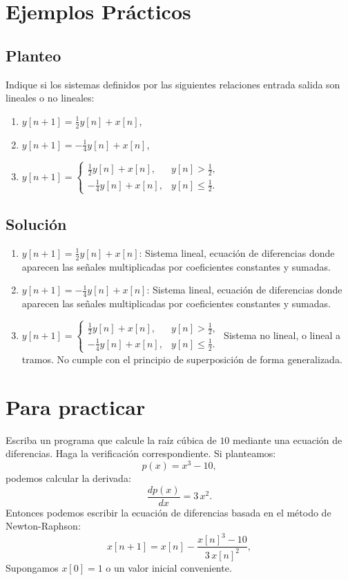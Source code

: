 \section{Ejemplos Prácticos}

\subsection{Planteo}
Indique si los sistemas definidos por las siguientes relaciones entrada salida son lineales o no lineales:
\begin{enumerate}
	\item $y[n+1] = \frac{1}{2} y[n] + x[n]$,
	\item $y[n+1] = -\frac{1}{4} y[n] + x[n]$,
	\item $y[n+1] = \begin{cases} \frac{1}{2}y[n] + x[n], & y[n] > \frac{1}{2}, \\ -\frac{1}{4}y[n] + x[n], & y[n] \leq \frac{1}{2}. \end{cases}$
\end{enumerate}

\subsection{Solución}
\begin{enumerate}
	\item $y[n+1] = \frac{1}{2}y[n] + x[n]$: Sistema lineal, ecuación de diferencias donde aparecen las señales multiplicadas por coeficientes constantes y sumadas.
	\item $y[n+1] = -\frac{1}{4}y[n] + x[n]$: Sistema lineal, ecuación de diferencias donde aparecen las señales multiplicadas por coeficientes constantes y sumadas.
	\item $y[n+1] = \begin{cases} \frac{1}{2}y[n] + x[n], & y[n] > \frac{1}{2}, \\ -\frac{1}{4}y[n] + x[n], & y[n] \leq \frac{1}{2}. \end{cases}$ Sistema no lineal, o lineal a tramos. No cumple con el principio de superposición de forma generalizada.
\end{enumerate}

\section{Para practicar}

Escriba un programa que calcule la raíz cúbica de $10$ mediante una ecuación de diferencias. Haga la verificación correspondiente.
Si planteamos:
\begin{equation}
	p(x) = x^{3} - 10,
\end{equation}
podemos calcular la derivada:
\begin{equation}
	\frac{dp(x)}{dx} = 3 \, x^{2}.
\end{equation}
Entonces podemos escribir la ecuación de diferencias basada en el método de Newton-Raphson:
\begin{equation}
	x[n+1] = x[n] - \frac{x[n]^{3} - 10}{3 \, x[n]^{2}},
\end{equation}
Supongamos $x[0] = 1$ o un valor inicial conveniente.
